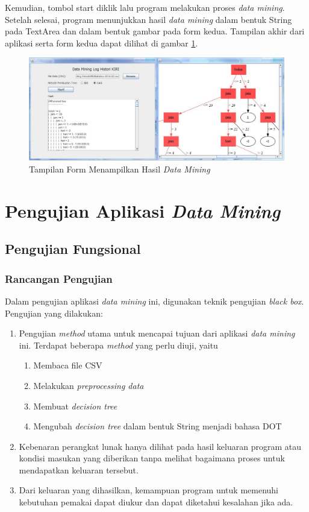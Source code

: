 Kemudian, tombol start diklik lalu program melakukan proses \textsl{data mining}. Setelah selesai, program menunjukkan hasil \textsl{data mining} dalam bentuk String pada TextArea dan dalam bentuk gambar pada form kedua. Tampilan akhir dari aplikasi serta form kedua dapat dilihat di gambar \ref{fig:GUI5}.

\begin{figure}[H]
\centering
\includegraphics[scale=0.4]{Gambar/GUI5.jpg}
\caption[Tampilan Form Menampilkan Hasil \textsl{Data Mining}]{Tampilan Form Menampilkan Hasil \textsl{Data Mining}} 
\label{fig:GUI5}
\end{figure}

\section{Pengujian Aplikasi \textsl{Data Mining}}

\subsection{Pengujian Fungsional}

\subsubsection{Rancangan Pengujian}

Dalam pengujian aplikasi \textsl{data mining} ini, digunakan teknik pengujian \textsl{black box}. Pengujian yang dilakukan:
\begin{enumerate}
	\item Pengujian \textsl{method} utama untuk mencapai tujuan dari aplikasi \textsl{data mining} ini. Terdapat beberapa \textsl{method} yang perlu diuji, yaitu
	\begin{enumerate}
		\item Membaca file CSV
		\item Melakukan \textsl{preprocessing data}
		\item Membuat \textsl{decision tree}
		\item Mengubah \textsl{decision tree} dalam bentuk String menjadi bahasa DOT
	\end{enumerate}
	\item Kebenaran perangkat lunak hanya dilihat pada hasil keluaran program atau kondisi masukan yang diberikan tanpa melihat bagaimana proses untuk mendapatkan keluaran tersebut.
	\item Dari keluaran yang dihasilkan, kemampuan program untuk memenuhi kebutuhan pemakai dapat diukur dan dapat diketahui kesalahan jika ada.
\end{enumerate}


